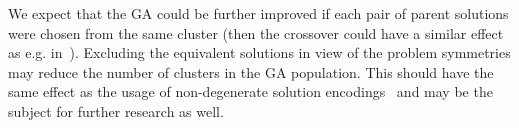 \documentclass{ifacconf}
\begin{document}
We expect that the GA could be further improved if each pair of parent solutions were chosen from the same cluster (then the crossover
could have a similar effect as e.g. in~\cite{bib:Dang2016a}). Excluding the equivalent solutions in view of the problem symmetries may 
reduce the number of clusters in the GA population.
This should have the same effect as the usage of non-degenerate solution encodings~\citep{ReevesDai} and may 
be the subject for further research as well. 

%
%
%
%

   
                                                  
\end{document}

